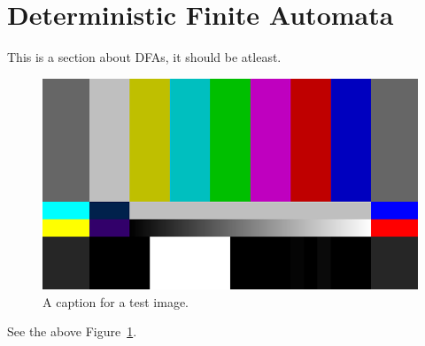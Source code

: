\section{Deterministic Finite Automata}

This is a section about DFAs, it should be atleast.

\begin{figure}
    \centering
    \includegraphics[width=0.7\linewidth]{images/test.png}
    \caption{A caption for a test image.}
    \label{fig:some-fig}

\end{figure}

See the above Figure~\ref{fig:some-fig}.
